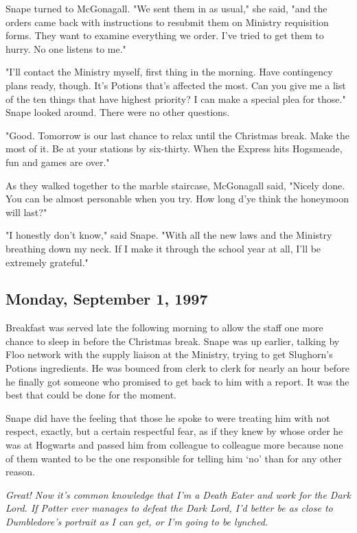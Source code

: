 Snape turned to McGonagall. "We sent them in as usual," she said, "and the orders came back with instructions to resubmit them on Ministry requisition forms. They want to examine everything we order. I've tried to get them to hurry. No one listens to me."

"I'll contact the Ministry myself, first thing in the morning. Have contingency plans ready, though. It's Potions that's affected the most. Can you give me a list of the ten things that have highest priority? I can make a special plea for those." Snape looked around. There were no other questions.

"Good. Tomorrow is our last chance to relax until the Christmas break. Make the most of it. Be at your stations by six-thirty. When the Express hits Hogsmeade, fun and games are over."

As they walked together to the marble staircase, McGonagall said, "Nicely done. You can be almost personable when you try. How long d'ye think the honeymoon will last?"

"I honestly don't know," said Snape. "With all the new laws and the Ministry breathing down my neck. If I make it through the school year at all, I'll be extremely grateful."

\subsection{Monday, September 1, 1997}

Breakfast was served late the following morning to allow the staff one more chance to sleep in before the Christmas break. Snape was up earlier, talking by Floo network with the supply liaison at the Ministry, trying to get Slughorn's Potions ingredients. He was bounced from clerk to clerk for nearly an hour before he finally got someone who promised to get back to him with a report. It was the best that could be done for the moment.

Snape did have the feeling that those he spoke to were treating him with{\el} not respect, exactly, but a certain respectful fear, as if they knew by whose order he was at Hogwarts and passed him from colleague to colleague more because none of them wanted to be the one responsible for telling him `no' than for any other reason.

\emph{Great! Now it's common knowledge that I'm a Death Eater and work for the Dark Lord. If Potter ever manages to defeat the Dark Lord, I'd better be as close to Dumbledore's portrait as I can get, or I'm going to be lynched.}

